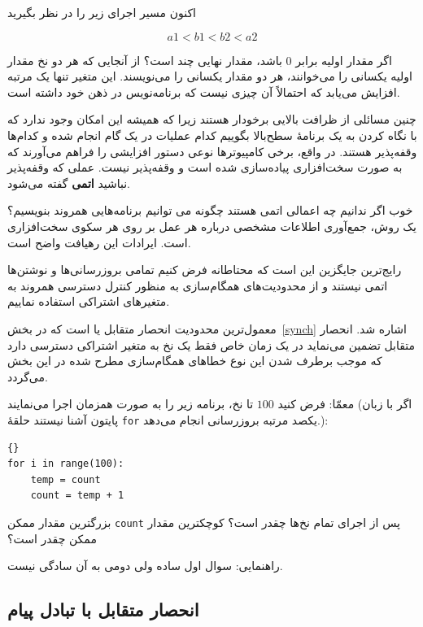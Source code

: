 \documentclass{book}
\begin{document}
    اکنون مسیر اجرای زیر را در نظر بگیرید
    
\[  a1 < b1 < b2 < a2  \]

    اگر مقدار اولیه  برابر \texttt{$0$} باشد، مقدار نهایی چند است؟
    از آنجایی که هر دو نخ مقدار اولیه یکسانی را می‌خوانند، هر دو مقدار یکسانی را می‌نویسند. 
    این متغیر تنها یک مرتبه افزایش می‌یابد که احتمالاً آن چیزی نیست که برنامه‌نویس در ذهن خود داشته است. 

    چنین مسائلی از ظرافت بالایی برخودار هستند 
    زیرا که     همیشه این امکان وجود ندارد که با نگاه کردن به یک برنامهٔ سطح‌بالا 
    بگوییم کدام عملیات در یک گام انجام شده و کدام‌ها وقفه‌پذیر هستند. 
    در واقع،‌ برخی کامپیوترها نوعی دستور افزایشی را فراهم می‌آورند که به صورت سخت‌افزاری پیاده‌سازی شده است و وقفه‌پذیر نیست. 
    عملی که وقفه‌پذیر نباشید \textbf{اتمی} گفته می‌شود. 

    خوب اگر ندانیم چه اعمالی اتمی هستند چگونه می توانیم برنامه‌هایی همروند بنویسیم؟
    یک روش، جمع‌آوری اطلاعات مشخصی درباره هر عمل بر روی هر سکوی سخت‌افزاری است. 
    ایرادات این رهیافت  واضح است. 

    رایج‌ترین جایگزین این است که محتاطانه فرض کنیم تمامی بروزرسانی‌ها و نوشتن‌ها اتمی نیستند و 
    از محدودیت‌های همگام‌سازی به منظور کنترل دسترسی همروند به متغیرهای اشتراکی استفاده نماییم. 

    معمول‌ترین محدودیت انحصار متقابل یا  است که 
    در بخش~\ref{synch}  اشاره شد. انحصار متقابل تضمین می‌نماید در یک زمان خاص  فقط یک نخ به متغیر اشتراکی دسترسی دارد 
    که موجب برطرف شدن این نوع خطاهای همگام‌سازی مطرح شده در این بخش می‌گردد. 
    
    معمّا: فرض کنید $100$ تا نخ، برنامه زیر را به صورت همزمان اجرا می‌نمایند (اگر با زبان پایتون آشنا نیستند حلقهٔ \texttt{for} یکصد مرتبه 
    بروزرسانی انجام می‌دهد.):

\begin{latin}
\begin{lstlisting}[]{}
for i in range(100):
    temp = count
    count = temp + 1
\end{lstlisting}
\end{latin}

    بزرگترین مقدار ممکن \texttt{count} پس از اجرای تمام نخ‌ها چقدر است؟ کوچکترین مقدار ممکن چقدر است؟ 
    

    راهنمایی: سوال اول ساده ولی دومی به آن سادگی نیست. 

\subsection {انحصار متقابل با تبادل پیام}
\end{document}
